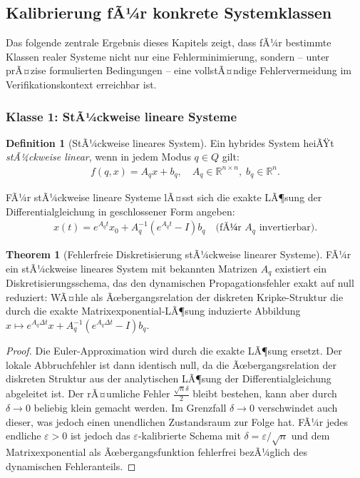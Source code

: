 ﻿\documentclass[a4paper,12pt]{article}
\theoremstyle{definition}
\newtheorem{definition}{Definition}[section]
\newtheorem{theorem}{Theorem}[section]
\begin{document}
\subsection{Kalibrierung fÃ¼r konkrete Systemklassen}

Das folgende zentrale Ergebnis dieses Kapitels zeigt, dass fÃ¼r bestimmte Klassen realer Systeme nicht nur eine Fehlerminimierung, sondern -- unter prÃ¤zise formulierten Bedingungen -- eine vollstÃ¤ndige Fehlervermeidung im Verifikationskontext erreichbar ist.

\subsubsection{Klasse 1: StÃ¼ckweise lineare Systeme}

\begin{definition}[StÃ¼ckweise lineares System]
Ein hybrides System heiÃŸt \emph{stÃ¼ckweise linear}, wenn in jedem Modus $q \in Q$ gilt:
\begin{align}
  f(q, x) = A_q x + b_q, \quad A_q \in \mathbb{R}^{n \times n},\; b_q \in \mathbb{R}^n.
\end{align}
\end{definition}

FÃ¼r stÃ¼ckweise lineare Systeme lÃ¤sst sich die exakte LÃ¶sung der Differentialgleichung in geschlossener Form angeben:
\begin{align}
  x(t) = e^{A_q t} x_0 + A_q^{-1}(e^{A_q t} - I) b_q \quad \text{(fÃ¼r } A_q \text{ invertierbar)}.
\end{align}

\begin{theorem}[Fehlerfreie Diskretisierung stÃ¼ckweise linearer Systeme]
\label{thm:fehlerfrei_linear}
FÃ¼r ein stÃ¼ckweise lineares System mit bekannten Matrizen $A_q$ existiert ein Diskretisierungsschema, das den dynamischen Propagationsfehler exakt auf null reduziert: WÃ¤hle als Ãœbergangsrelation der diskreten Kripke-Struktur die durch die exakte Matrixexponential-LÃ¶sung induzierte Abbildung $x \mapsto e^{A_q \Delta t} x + A_q^{-1}(e^{A_q \Delta t} - I) b_q$.
\end{theorem}

\begin{proof}
Die Euler-Approximation wird durch die exakte LÃ¶sung ersetzt. Der lokale Abbruchfehler ist dann identisch null, da die Ãœbergangsrelation der diskreten Struktur aus der analytischen LÃ¶sung der Differentialgleichung abgeleitet ist. Der rÃ¤umliche Fehler $\frac{\sqrt{n}\delta}{2}$ bleibt bestehen, kann aber durch $\delta \to 0$ beliebig klein gemacht werden. Im Grenzfall $\delta \to 0$ verschwindet auch dieser, was jedoch einen unendlichen Zustandsraum zur Folge hat. FÃ¼r jedes endliche $\varepsilon > 0$ ist jedoch das $\varepsilon$-kalibrierte Schema mit $\delta = \varepsilon/\sqrt{n}$ und dem Matrixexponential als Ãœbergangsfunktion fehlerfrei bezÃ¼glich des dynamischen Fehleranteils.
\end{proof}
\end{document}
